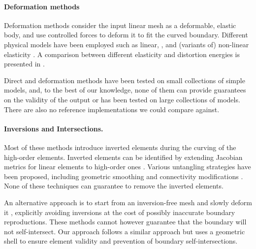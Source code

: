 \paragraph{Deformation methods} Deformation methods consider the input linear mesh as a deformable, elastic body, and use controlled forces to deform it to fit the curved boundary. Different physical models have been employed such as linear, \cite{Abgrall2014,abgrall2012,dobrzynski2017,Xie2013}, and (variants of) non-linear elasticity \cite{Persson2009,MOXEY2016130,FORTUNATO20161}. A comparison between different elasticity and distortion energies is presented in \cite{Poya2016, TURNER2016340, dobrev2019target}.

Direct and deformation methods have been tested on small collections of simple models, and, to the best of our knowledge, none of them can provide guarantees on the validity of the output or has been tested on large collections of models. There are also no  reference implementations we could compare against. 

\paragraph{Inversions and Intersections.} Most of these methods introduce inverted elements during the curving of the high-order elements. Inverted elements can be identified by extending Jacobian metrics for linear elements \cite{Knupp20002,Knupp2000} to high-order ones \cite{Luke2018,Gargallo2014,johnen2013geometrical,Poya2016,Roca2012}. Various untangling strategies have been proposed, including geometric smoothing and connectivity modifications  \cite{Cardoze2004,dey1999curvilinear,gargallo2013high,George2012,Qiukai2013,Luo2002pVersionMG,Peir2008,SHEPHARD2005251,dobrzynski2017,Gargallo2015,Geuzaine2015,Roca2012,RUIZGIRONES2017362,RUIZGIRONES201652,RUIZGIRONES2016315,STEES2017180,Steve2016,TOULORGE20138,TOULORGE2016361,ZIEL201791,dobrev2019target, turner2017high, luo2008tracking,lu2014parallel}.  None of these techniques can guarantee to remove the inverted elements.

An alternative approach is to start from an inversion-free mesh and slowly deform it \cite{Persson2009,RUIZGIRONES2017362}, explicitly avoiding inversions at the cost of possibly inaccurate boundary reproductions. These methods cannot however guarantee that the boundary will not self-intersect. Our approach follows a similar approach but uses a geometric shell to ensure element validity and prevention of boundary self-intersections.

